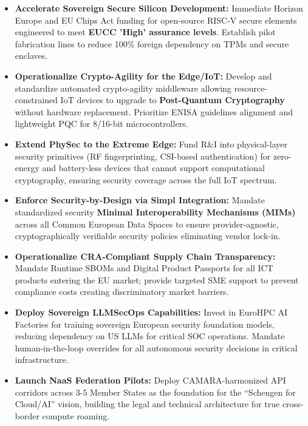 \documentclass[12pt,a4paper]{report}
\begin{document}
\begin{itemize}
    \item \textbf{Accelerate Sovereign Secure Silicon Development:} Immediate Horizon Europe and EU Chips Act funding for open-source RISC-V secure elements engineered to meet \textbf{EUCC 'High' assurance levels}. Establish pilot fabrication lines to reduce 100\% foreign dependency on TPMs and secure enclaves.
    
    \item \textbf{Operationalize Crypto-Agility for the Edge/IoT:} Develop and standardize automated crypto-agility middleware allowing resource-constrained IoT devices to upgrade to \textbf{Post-Quantum Cryptography} without hardware replacement. Prioritize ENISA guidelines alignment and lightweight PQC for 8/16-bit microcontrollers.
    
    \item \textbf{Extend PhySec to the Extreme Edge:} Fund R\&I into physical-layer security primitives (RF fingerprinting, CSI-based authentication) for zero-energy and battery-less devices that cannot support computational cryptography, ensuring security coverage across the full IoT spectrum.
    
    \item \textbf{Enforce Security-by-Design via Simpl Integration:} Mandate standardized security \textbf{Minimal Interoperability Mechanisms (MIMs)} across all Common European Data Spaces to ensure provider-agnostic, cryptographically verifiable security policies eliminating vendor lock-in.
    
    \item \textbf{Operationalize CRA-Compliant Supply Chain Transparency:} Mandate Runtime SBOMs and Digital Product Passports for all ICT products entering the EU market; provide targeted SME support to prevent compliance costs creating discriminatory market barriers.
    
    \item \textbf{Deploy Sovereign LLMSecOps Capabilities:} Invest in EuroHPC AI Factories for training sovereign European security foundation models, reducing dependency on US LLMs for critical SOC operations. Mandate human-in-the-loop overrides for all autonomous security decisions in critical infrastructure.
    
    \item \textbf{Launch NaaS Federation Pilots:} Deploy CAMARA-harmonized API corridors across 3-5 Member States as the foundation for the ``Schengen for Cloud/AI'' vision, building the legal and technical architecture for true cross-border compute roaming.
    

\end{itemize}
\end{document}
